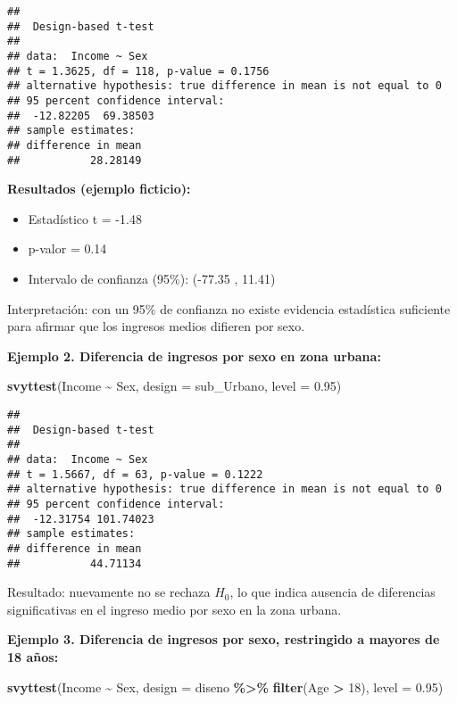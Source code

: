 \documentclass[
  12pt,
]{book}
\newenvironment{Shaded}{\begin{snugshade}}{\end{snugshade}}
\newcommand{\AttributeTok}[1]{\textcolor[rgb]{0.13,0.29,0.53}{#1}}
\newcommand{\DecValTok}[1]{\textcolor[rgb]{0.00,0.00,0.81}{#1}}
\newcommand{\FloatTok}[1]{\textcolor[rgb]{0.00,0.00,0.81}{#1}}
\newcommand{\FunctionTok}[1]{\textcolor[rgb]{0.13,0.29,0.53}{\textbf{#1}}}
\newcommand{\NormalTok}[1]{#1}
\newcommand{\SpecialCharTok}[1]{\textcolor[rgb]{0.81,0.36,0.00}{\textbf{#1}}}
\providecommand{\tightlist}{%
  \setlength{\itemsep}{0pt}\setlength{\parskip}{0pt}}
\begin{document}
\begin{verbatim}
## 
##  Design-based t-test
## 
## data:  Income ~ Sex
## t = 1.3625, df = 118, p-value = 0.1756
## alternative hypothesis: true difference in mean is not equal to 0
## 95 percent confidence interval:
##  -12.82205  69.38503
## sample estimates:
## difference in mean 
##           28.28149
\end{verbatim}

\textbf{Resultados (ejemplo ficticio):}

\begin{itemize}
\tightlist
\item
  Estadístico t = -1.48
\item
  p-valor = 0.14
\item
  Intervalo de confianza (95\%): (-77.35 , 11.41)
\end{itemize}

Interpretación: con un 95\% de confianza no existe evidencia estadística suficiente para afirmar que los ingresos medios difieren por sexo.

\textbf{Ejemplo 2. Diferencia de ingresos por sexo en zona urbana:}

\begin{Shaded}
\begin{Highlighting}[]
\FunctionTok{svyttest}\NormalTok{(Income }\SpecialCharTok{\textasciitilde{}}\NormalTok{ Sex, }\AttributeTok{design =}\NormalTok{ sub\_Urbano, }\AttributeTok{level =} \FloatTok{0.95}\NormalTok{)}
\end{Highlighting}
\end{Shaded}

\begin{verbatim}
## 
##  Design-based t-test
## 
## data:  Income ~ Sex
## t = 1.5667, df = 63, p-value = 0.1222
## alternative hypothesis: true difference in mean is not equal to 0
## 95 percent confidence interval:
##  -12.31754 101.74023
## sample estimates:
## difference in mean 
##           44.71134
\end{verbatim}

Resultado: nuevamente no se rechaza \(H_0\), lo que indica ausencia de diferencias significativas en el ingreso medio por sexo en la zona urbana.

\textbf{Ejemplo 3. Diferencia de ingresos por sexo, restringido a mayores de 18 años:}

\begin{Shaded}
\begin{Highlighting}[]
\FunctionTok{svyttest}\NormalTok{(Income }\SpecialCharTok{\textasciitilde{}}\NormalTok{ Sex,}
         \AttributeTok{design =}\NormalTok{ diseno }\SpecialCharTok{\%\textgreater{}\%} \FunctionTok{filter}\NormalTok{(Age }\SpecialCharTok{\textgreater{}} \DecValTok{18}\NormalTok{),}
         \AttributeTok{level =} \FloatTok{0.95}\NormalTok{)}
\end{Highlighting}
\end{Shaded}
\end{document}

